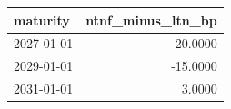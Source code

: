 \begin{tabular}{lr}
\toprule
maturity & ntnf_minus_ltn_bp \\
\midrule
2027-01-01 & -20.0000 \\
2029-01-01 & -15.0000 \\
2031-01-01 & 3.0000 \\
\bottomrule
\end{tabular}
